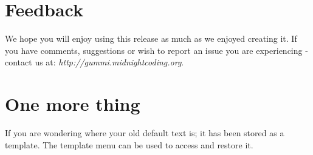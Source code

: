 \documentclass[11pt]{article}
\begin{document}
\section{Feedback}
We hope you will enjoy using this release as much as we enjoyed creating it. If you have comments, suggestions or wish to report an issue you are experiencing - contact us at: \emph{http://gummi.midnightcoding.org}.

\section{One more thing}
If you are wondering where your old default text is; it has been stored as a template. The template menu can be used to access and restore it. 
\end{document}
